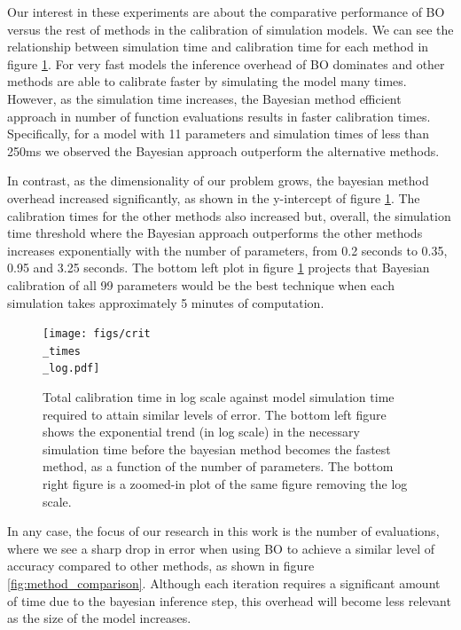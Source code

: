 \documentclass{IOS-Book-Article}
\begin{document}
	Our interest in these experiments are about the comparative performance of BO versus the rest of methods in the calibration of simulation models. We can see the relationship between simulation time and calibration time for each method in figure \ref{fig:sim_times}. For very fast models the inference overhead of BO dominates and other methods are able to calibrate faster by simulating the model many times. However, as the simulation time increases, the Bayesian method efficient approach in number of function evaluations results in faster calibration times. Specifically, for a model with 11 parameters and simulation times of less than 250ms we observed the Bayesian approach outperform the alternative methods.
	
	In contrast, as the dimensionality of our problem grows, the bayesian method overhead increased significantly, as shown in the y-intercept of figure \ref{fig:sim_times}. The calibration times for the other methods also increased but, overall, the simulation time threshold where the Bayesian approach outperforms the other methods increases exponentially with the number of parameters, from 0.2 seconds to 0.35, 0.95 and 3.25 seconds. The bottom left plot in figure \ref{fig:sim_times} projects that Bayesian calibration of all 99 parameters would be the best technique when each simulation takes approximately 5 minutes of computation.
	
	\begin{figure}[h!]
		\centering	
		\texttt{[image: figs/crit\\\_times\\\_log.pdf]}		
		\caption{Total calibration time in log scale against model simulation time required to attain similar levels of error. The bottom left figure shows the exponential trend (in log scale) in the necessary simulation time before the bayesian method becomes the fastest method, as a function of the number of parameters. The bottom right figure is a zoomed-in plot of the same figure removing the log scale.}
		\label{fig:sim_times}	
	\end{figure}
	
	In any case, the focus of our research in this work is the number of evaluations, where we see a sharp drop in error when using BO to achieve a similar level of accuracy compared to other methods, as shown in figure \ref{fig:method_comparison}. Although each iteration requires a significant amount of time due to the bayesian inference step, this overhead will become less relevant as the size of the model increases.
	
\end{document}
